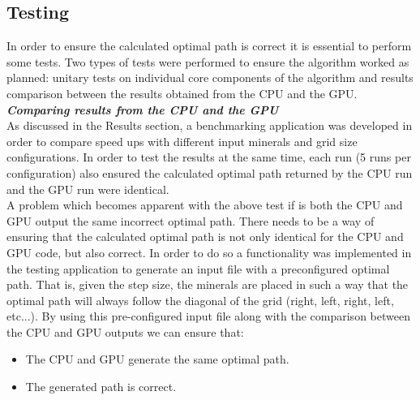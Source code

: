 \documentclass[11pt]{IEEEtran}
\begin{document}
\subsection{Testing}
In order to ensure the calculated optimal path is correct it is essential to perform some tests. Two types of tests were performed to ensure the algorithm worked as planned: unitary tests on individual core components of the algorithm and results comparison between the results obtained from the CPU and the GPU.\\

\textbf{\textit{Comparing results from the CPU and the GPU}}\\
As discussed in the Results section, a benchmarking application was developed in order to compare speed ups with different input minerals and grid size configurations. In order to test the results at the same time, each run (5 runs per configuration) also ensured the calculated optimal path returned by the CPU run and the GPU run were identical.\\

A problem which becomes apparent with the above test if is both the CPU and GPU output the same incorrect optimal path. There needs to be a way of ensuring that the calculated optimal path is not only identical for the CPU and GPU code, but also correct. In order to do so a functionality was implemented in the testing application to generate an input file with a preconfigured optimal path. That is, given the step size, the minerals are placed in such a way that the optimal path will always follow the diagonal of the grid (right, left, right, left, etc...). By using this pre-configured input file along with the comparison between the CPU and GPU outputs we can ensure that:
\begin{itemize}
	\item The CPU and GPU generate the same optimal path.
	\item The generated path is correct.\\
\end{itemize}
\end{document}
